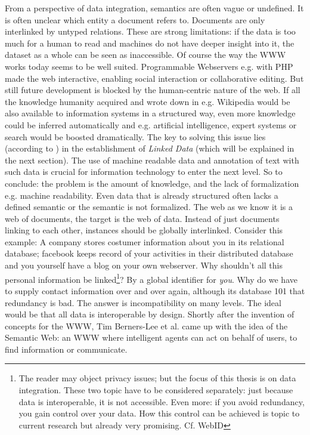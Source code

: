 From a perspective of data integration, semantics are often vague or undefined. 
It is often unclear which entity a document refers to. 
Documents are only interlinked by untyped relations. 
These are strong limitations: if the data is too much for a human to read and machines do not have deeper insight into it, the dataset as a whole can be seen as inaccessible. 
Of course the way the WWW works today seems to be well suited. 
Programmable Webservers e.g. with PHP made the web interactive, enabling social interaction or collaborative editing. But still future development is blocked by the human-centric nature of the web. 
If all the knowledge humanity acquired and wrote down in e.g. Wikipedia would be also available to information systems in a structured way, even more knowledge could be inferred automatically and e.g. artificial intelligence, expert systems or search would be boosted dramatically. 
The key to solving this issue lies (according to \cite{berners}) in the establishment of \textit{Linked Data} (which will be explained in the next section). 
The use of machine readable data and annotation of text with such data is crucial for information technology to enter the next level.
So to conclude: the problem is the amount of knowledge, and the lack of formalization e.g. machine readability. 
Even data that is already structured often lacks a defined semantic or the semantic is not formalized. 
The web as we know it is a web of documents, the target is the web of data. 
Instead of just documents linking to each other, instances should be globally interlinked. 
Consider this example: A company stores costumer information about you in its relational database; facebook keeps record of your activities in their distributed database and you yourself have a blog on your own webserver. 
Why shouldn't all this personal information be linked\footnote{The reader may object privacy issues; but the focus of this thesis is on data integration. These two topic have to be considered separately: just because data is interoperable, it is not accessible. 
Even more: if you avoid redundancy, you gain control over your data. 
How this control can be achieved is topic to current research but already very promising. Cf. WebID}? By a global identifier for \textit{you}. 
Why do we have to supply contact information over and over again, although its database 101 that redundancy is bad. 
The answer is incompatibility on many levels. The ideal would be that all data is interoperable by design. 
Shortly after the invention of concepts for the WWW, Tim Berners-Lee et al. came up with the idea of the Semantic Web: an WWW where intelligent agents can act on behalf of users, to find information or communicate.

